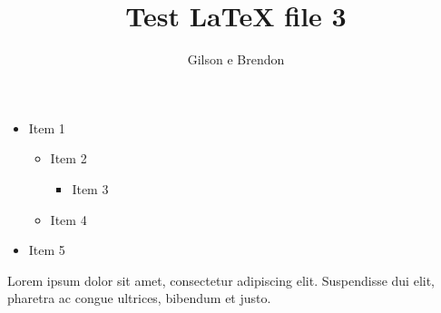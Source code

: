 \documentclass[12pt]{article}
\title{Test LaTeX file 3}
\author{Gilson e Brendon}
\begin{document}
\maketitle

\begin{itemize}
\item Item 1
\begin{itemize}
\item Item 2
\begin{itemize}
\item Item 3
\end{itemize}
\item Item 4
\end{itemize}
\item Item 5
\end{itemize}

Lorem ipsum dolor sit amet, consectetur adipiscing elit. Suspendisse dui elit, pharetra ac congue ultrices, bibendum et justo. 
\end{document}
